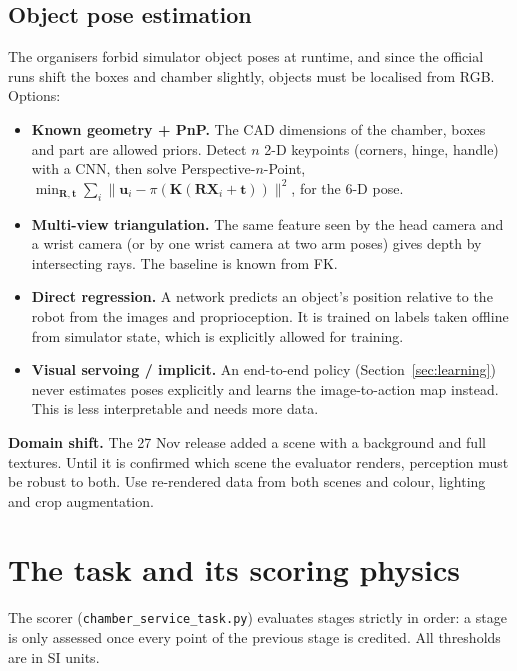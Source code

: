 \documentclass[10pt,a4paper]{article}
\begin{document}
\subsection{Object pose estimation}
The organisers forbid simulator object poses at runtime, and since the official runs shift the boxes and chamber slightly, objects must be localised from RGB. Options:
\begin{itemize}
\item \textbf{Known geometry + PnP.} The CAD dimensions of the chamber, boxes and part are allowed priors. Detect $n$ 2-D keypoints (corners, hinge, handle) with a CNN, then solve Perspective-$n$-Point, $\min_{\bm R,\bm t}\sum_i\|\bm u_i-\pi(\bm K(\bm R\bm X_i+\bm t))\|^2$, for the 6-D pose.
\item \textbf{Multi-view triangulation.} The same feature seen by the head camera and a wrist camera (or by one wrist camera at two arm poses) gives depth by intersecting rays. The baseline is known from FK.
\item \textbf{Direct regression.} A network predicts an object's position relative to the robot from the images and proprioception. It is trained on labels taken offline from simulator state, which is explicitly allowed for training.
\item \textbf{Visual servoing / implicit.} An end-to-end policy (Section~\ref{sec:learning}) never estimates poses explicitly and learns the image-to-action map instead. This is less interpretable and needs more data.
\end{itemize}
\textbf{Domain shift.} The 27 Nov release added a scene with a background and full textures. Until it is confirmed which scene the evaluator renders, perception must be robust to both. Use re-rendered data from both scenes and colour, lighting and crop augmentation.

\section{The task and its scoring physics}
The scorer (\texttt{chamber\_service\_task.py}) evaluates stages strictly in order: a stage is only assessed once every point of the previous stage is credited. All thresholds are in SI units.
\end{document}
